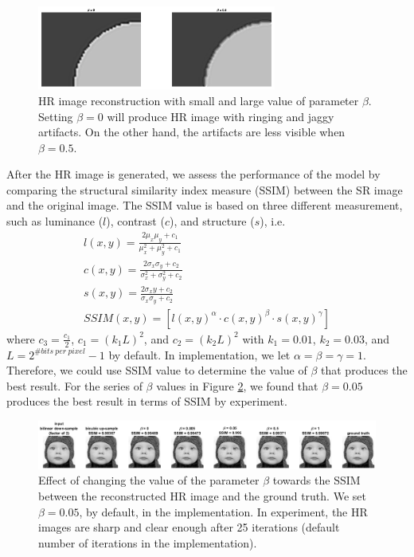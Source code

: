 \documentclass[a4paper,11pt]{article}
\begin{document}
\begin{figure}[H]
	\centering
	\includegraphics[width=0.7\textwidth]{beta 0 05.png}
	\caption{HR image reconstruction with small and large value of parameter $\beta$. Setting $\beta = 0$ will produce HR image with ringing and jaggy artifacts. On the other hand, the artifacts are less visible when $\beta = 0.5$.}
	\label{fig:beta2}
\end{figure}
 
After the HR image is generated, we assess the performance of the model by comparing the structural similarity index measure (SSIM) between the SR image and the original image. The SSIM value is based on three different measurement, such as luminance ($l$), contrast ($c$), and structure ($s$), i.e.
\begin{gather*}
	l(x,y) = \frac{2 \mu_x \mu_y + c_1}{\mu_x^2 + \mu_y^2 + c_1}\\
	c(x,y) = \frac{2 \sigma_x \sigma_y + c_2}{\sigma_x^2 + \sigma_y^2 + c_2}\\
	s(x,y) = \frac{2 \sigma_xy + c_2}{\sigma_x \sigma_y + c_2}\\
	SSIM(x,y) = [l(x,y)^\alpha \cdot c(x,y)^\beta \cdot s(x,y)^\gamma]
\end{gather*}
where $c_3 = \frac{c_1}{2}$, $c_1=(k_1L)^2$, and $c_2=(k_2L)^2$ with $k_1=0.01$, $k_2=0.03$, and $L=2^{\#bits\ per\ pixel}-1$ by default. In implementation, we let $\alpha = \beta = \gamma = 1$. Therefore, we could use SSIM value to determine the value of $\beta$ that produces the best result. For the series of $\beta$ values in Figure \ref{fig:beta}, we found that $\beta = 0.05$ produces the best result in terms of SSIM by experiment.

\begin{figure}[H]
	\centering
	\includegraphics[width=1\textwidth]{beta.png}
	\caption{Effect of changing the value of the parameter $\beta$ towards the SSIM between the reconstructed HR image and the ground truth. We set $\beta = 0.05$, by default, in the implementation. In experiment, the HR images are sharp and clear enough after 25 iterations (default number of iterations in the implementation).}
	\label{fig:beta}
\end{figure}
\end{document}
